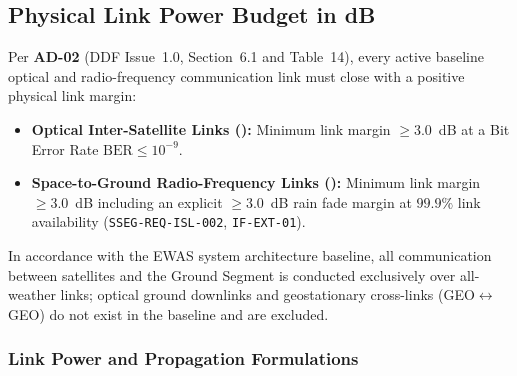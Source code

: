\subsection{Physical Link Power Budget in dB}
\label{sec:physical_link_budget}

Per \textbf{AD-02} (DDF Issue~1.0, Section~6.1 and Table~14), every active baseline optical and radio-frequency communication link must close with a positive physical link margin:
\begin{itemize}
    \item \textbf{Optical Inter-Satellite Links ():} Minimum link margin $\ge 3.0$~dB at a Bit Error Rate $\text{BER} \le 10^{-9}$.
    \item \textbf{Space-to-Ground Radio-Frequency Links ():} Minimum link margin $\ge 3.0$~dB including an explicit $\ge 3.0$~dB rain fade margin at $99.9\%$ link availability (\texttt{SSEG-REQ-ISL-002}, \texttt{IF-EXT-01}).
\end{itemize}
In accordance with the EWAS system architecture baseline, all communication between satellites and the Ground Segment is conducted exclusively over all-weather  links; optical ground downlinks and geostationary cross-links (GEO$\leftrightarrow$GEO) do not exist in the baseline and are excluded.

\subsubsection{Link Power and Propagation Formulations}

